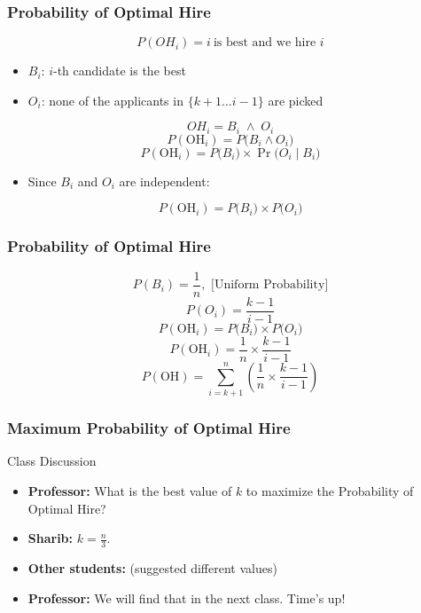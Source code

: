     \begin{frame}
      \frametitle{Probability of Optimal Hire}
      \centering
      \[
        P(OH_i) = i\ \text{is best and we hire }i
        \]
        \begin{itemize}
          \item \(B_i\): \(i\)-th candidate is the best
          \item \(O_i\): none of the applicants in \(\{k+1 \ldots i-1\}\) are picked
        \end{itemize}
      
        \[
          OH_i = B_i \;\land\; O_i
        \]
\[
P(\text{OH}_i)
= P\bigl(B_i \wedge O_i\bigr)
\]
\[
P(\text{OH}_i)
= P\bigl(B_i\bigr) \times \Pr\bigl(O_i \mid B_i\bigr)
\]
\begin{itemize}
\item Since \(B_i\) and \(O_i\) are independent:
\end{itemize}

\[
P(\text{OH}_i)
= P\bigl(B_i\bigr) \times P\bigl(O_i\bigr)
\]
    \end{frame}
\begin{frame}
\frametitle{Probability of Optimal Hire}
\centering
\[
P(B_i)= \frac{1}{n},      \text{     [Uniform Probability]}
\]
\[
  P(O_i)= \frac{k-1}{i-1}
  \]
  \[
P(\text{OH}_i)
= P\bigl(B_i\bigr) \times P\bigl(O_i\bigr)
\]
\[
P(\text{OH}_i)
= \frac{1}{n} \times \frac{k-1}{i-1}
\]
\[
P(\text{OH}) = \sum_{i=k+1}^{n} \left( \frac{1}{n} \times \frac{k-1}{i-1}   \right)
\]


\end{frame}
    \begin{frame}
      \frametitle{Maximum Probability of Optimal Hire}
      \begin{block}{Class Discussion}
        \begin{itemize}
          \item \textbf{Professor:} What is the best value of \(k\) to maximize the Probability of Optimal Hire?
          \item \textbf{Sharib:} \(k = \frac{n}{3}\).
          \item \textbf{Other students:} (suggested different values)
          \item \textbf{Professor:} We will find that in the next class. Time's up!
        \end{itemize}
      \end{block}
    \end{frame}
    
    